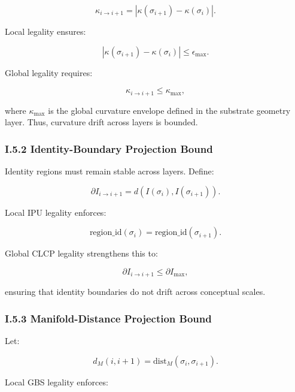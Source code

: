\[
\kappa_{i \rightarrow i+1}
    = \left| \kappa(\sigma_{i+1}) - \kappa(\sigma_i) \right|.
\]



Local legality ensures:



\[
|\kappa(\sigma_{i+1}) - \kappa(\sigma_i)| \le \epsilon_{\max}.
\]



Global legality requires:



\[
\kappa_{i \rightarrow i+1} \le \kappa_{\max},
\]



where $\kappa_{\max}$ is the global curvature envelope defined in the substrate
geometry layer. Thus, curvature drift across layers is bounded.

\subsubsection*{I.5.2 Identity-Boundary Projection Bound}

Identity regions must remain stable across layers. Define:



\[
\partial I_{i \rightarrow i+1}
    = d\!\left( I(\sigma_i), I(\sigma_{i+1}) \right).
\]



Local IPU legality enforces:



\[
\text{region\_id}(\sigma_i) = \text{region\_id}(\sigma_{i+1}).
\]



Global CLCP legality strengthens this to:



\[
\partial I_{i \rightarrow i+1} \le \partial I_{\max},
\]



ensuring that identity boundaries do not drift across conceptual scales.

\subsubsection*{I.5.3 Manifold-Distance Projection Bound}

Let:



\[
d_M(i,i+1) = \mathrm{dist}_M(\sigma_i, \sigma_{i+1}).
\]



Local GBS legality enforces:



